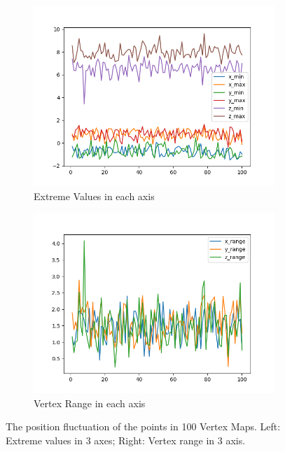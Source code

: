 \begin{figure}[!h]
	\centering
	\captionsetup{width=\linewidth}
	\begin{subfigure}[b]{0.49\linewidth}
		\includegraphics[width=\textwidth]{./Figures/Data_Extreme.png}
		\caption{Extreme Values in each axis }
	\end{subfigure}
	\begin{subfigure}[b]{0.49\linewidth}
		\includegraphics[width=\textwidth]{./Figures/Data_Range.png}
		\caption{Vertex Range in each axis}
	\end{subfigure}
	\decoRule
	\caption{The position fluctuation of the points in 100 Vertex Maps. 
		Left: Extreme values in 3 axes; Right: Vertex range in 3 axis.}
	\label{fig:data_range}
\end{figure}

